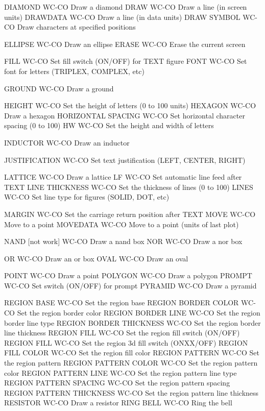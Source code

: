 DIAMOND                     WC-CO Draw a diamond
DRAW                        WC-CO Draw a line (in screen units)
DRAWDATA                    WC-CO Draw a line (in data units)
DRAW SYMBOL                 WC-CO Draw characters at specified positions

ELLIPSE                     WC-CO Draw an ellipse
ERASE                       WC-CO Erase the current screen

FILL                        WC-CO Set fill switch (ON/OFF) for TEXT figure
FONT                        WC-CO Set font for letters (TRIPLEX, COMPLEX, etc)

GROUND                      WC-CO Draw a ground

HEIGHT                      WC-CO Set the height of letters (0 to 100 units)
HEXAGON                     WC-CO Draw a hexagon
HORIZONTAL SPACING          WC-CO Set horizontal character spacing (0 to 100)
HW                          WC-CO Set the height and width of letters

INDUCTOR                    WC-CO Draw an inductor

JUSTIFICATION               WC-CO Set text justification (LEFT, CENTER, RIGHT)

LATTICE                     WC-CO Draw a lattice
LF                          WC-CO Set automatic line feed after TEXT
LINE THICKNESS              WC-CO Set the thickness of lines (0 to 100)
LINES                       WC-CO Set line type for figures (SOLID, DOT, etc)

MARGIN                      WC-CO Set the carriage return position after TEXT
MOVE                        WC-CO Move to a point
MOVEDATA                    WC-CO Move to a point (units of last plot)

NAND       [not work]       WC-CO Draw a nand box
NOR                         WC-CO Draw a nor box

OR                          WC-CO Draw an or box
OVAL                        WC-CO Draw an oval

POINT                       WC-CO Draw a point
POLYGON                     WC-CO Draw a polygon
PROMPT                      WC-CO Set switch (ON/OFF) for prompt
PYRAMID                     WC-CO Draw a pyramid

REGION BASE                 WC-CO Set the region base
REGION BORDER COLOR         WC-CO Set the region border color
REGION BORDER LINE          WC-CO Set the region border line type
REGION BORDER THICKNESS     WC-CO Set the region border line thickness
REGION FILL                 WC-CO Set the region fill switch (ON/OFF)
REGION FILL                 WC-CO Set the region 3d fill switch (ONXX/OFF)
REGION FILL COLOR           WC-CO Set the region fill color
REGION PATTERN              WC-CO Set the region pattern
REGION PATTERN COLOR        WC-CO Set the region pattern color
REGION PATTERN LINE         WC-CO Set the region pattern line type
REGION PATTERN SPACING      WC-CO Set the region pattern spacing
REGION PATTERN THICKNESS    WC-CO Set the region pattern line thickness
RESISTOR                    WC-CO Draw a resistor
RING BELL                   WC-CO Ring the bell

